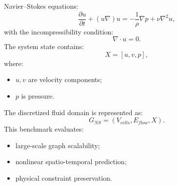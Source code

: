 Navier--Stokes equations: \begin{equation} \frac{\partial u}{\partial t} + (u\nabla)u = -\frac{1}{\rho}\nabla p + \nu\nabla^2u, \end{equation} with the incompressibility condition: \begin{equation} \nabla\cdot u=0. \end{equation} The system state contains: \begin{equation} X = [u,v,p], \end{equation} where: \begin{itemize} \item $u,v$ are velocity components; \item $p$ is pressure. \end{itemize} The discretized fluid domain is represented as: \begin{equation} G_{NS} = (V_{cells},E_{flow},X). \end{equation} This benchmark evaluates: \begin{itemize} \item large-scale graph scalability; \item nonlinear spatio-temporal prediction; \item physical constraint preservation. \end{itemize} %